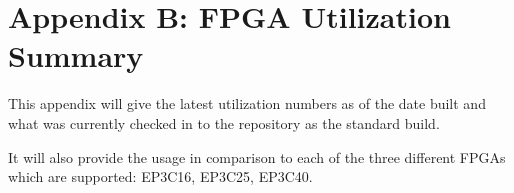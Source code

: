 \section{Appendix B: FPGA Utilization Summary} %
\label{sec:appendix-b}
    This appendix will give the latest utilization numbers as of the date built and
    what was currently checked in to the repository as the standard build.
    
    It will also provide the usage in comparison to each of the three different
    FPGAs which are supported: EP3C16, EP3C25, EP3C40.
